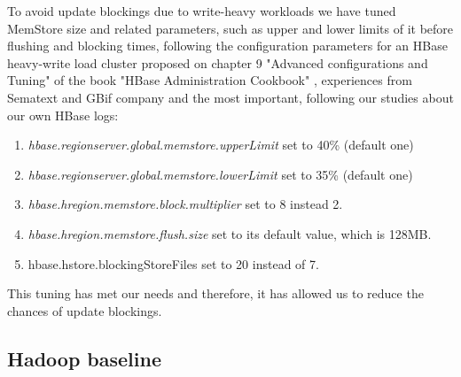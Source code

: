 \begin{enumerate}
To avoid update blockings due to write-heavy workloads we have tuned MemStore size and related parameters, such as upper and lower limits of it before flushing and blocking times, following the configuration parameters for an HBase heavy-write load cluster proposed on chapter 9 "Advanced configurations and Tuning" of the book "HBase Administration Cookbook" \cite{jiang2012hbase}, experiences from Sematext \cite{MemstoreSematext} and GBif company \cite{MemstoreGBif} and the most important, following our studies about our own HBase logs:
\bigskip
\begin{enumerate}
\item \textit{hbase.regionserver.global.memstore.upperLimit} set to 40\% (default one)
\item \textit{hbase.regionserver.global.memstore.lowerLimit} set to 35\% (default one)
\item \textit{hbase.hregion.memstore.block.multiplier} set to 8 instead 2.
\item \textit{hbase.hregion.memstore.flush.size} set to its default value, which is 128MB.
\item {hbase.hstore.blockingStoreFiles} set to 20 instead of 7.
\end{enumerate}

This tuning has met our needs and therefore, it has allowed us to reduce the chances of update blockings.
\par


\end{enumerate}


\subsection{Hadoop baseline}

